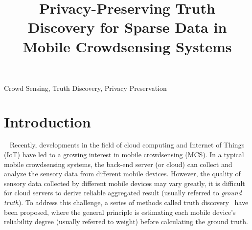 \documentclass[conference]{IEEEtran}
\begin{document}
\title{Privacy-Preserving Truth Discovery for Sparse Data in Mobile Crowdsensing Systems\\
}

\author{
}
\maketitle

\begin{abstract}

\end{abstract}

\begin{IEEEkeywords}
Crowd Sensing, Truth Discovery, Privacy Preservation
\end{IEEEkeywords}

\section{Introduction}~\label{sec1}
Recently, developments in the field of cloud computing and Internet of Things (IoT) have led to a growing interest in mobile crowdsensing (MCS).
In a typical mobile crowdsensing systems, the back-end server (or cloud) can collect and analyze the sensory data from different mobile devices.
However, the quality of sensory data collected by different mobile devices may vary greatly, it is difficult for cloud servers to derive reliable aggregated result (usually referred to \textit{ground truth}).
To address this challenge, a series of methods called truth discovery~\cite{li_resolving_2014,li_confidence-aware_2014} have been proposed, where the general principle is estimating each mobile device's reliability degree (usually referred to weight) before calculating the ground truth.
\end{document}
